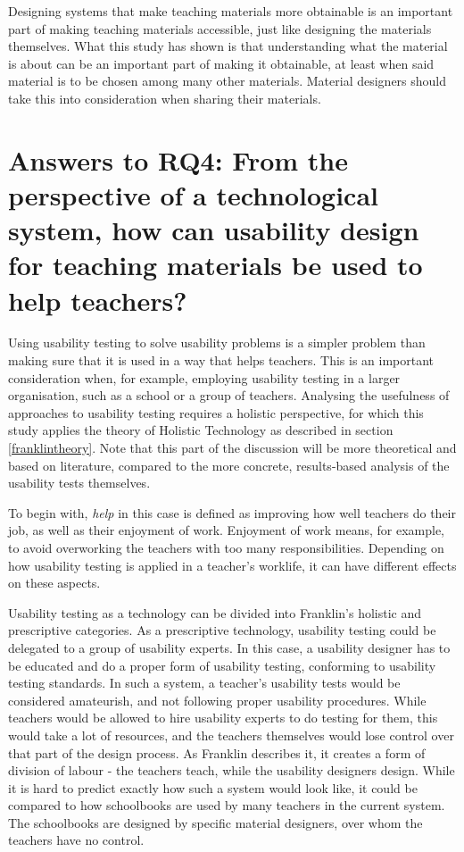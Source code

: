 Designing systems that make teaching materials more obtainable is an important part of making teaching materials accessible, just like designing the materials themselves. What this study has shown is that understanding what the material is about can be an important part of making it obtainable, at least when said material is to be chosen among many other materials. Material designers should take this into consideration when sharing their materials.

\section{Answers to RQ4: From the perspective of a technological system, how can usability design for teaching materials be used to help teachers?}

Using usability testing to solve usability problems is a simpler problem than making sure that it is used in a way that helps teachers. This is an important consideration when, for example, employing usability testing in a larger organisation, such as a school or a group of teachers. Analysing the usefulness of approaches to usability testing requires a holistic perspective, for which this study applies the theory of Holistic Technology as described in section \ref{franklintheory}. Note that this part of the discussion will be more theoretical and based on literature, compared to the more concrete, results-based analysis of the usability tests themselves.

To begin with, \textit{help} in this case is defined as improving how well teachers do their job, as well as their enjoyment of work. Enjoyment of work means, for example, to avoid overworking the teachers with too many responsibilities. Depending on how usability testing is applied in a teacher's worklife, it can have different effects on these aspects.

Usability testing as a technology can be divided into Franklin's holistic and prescriptive categories. As a prescriptive technology, usability testing could be delegated to a group of usability experts. In this case, a usability designer has to be educated and do a proper form of usability testing, conforming to usability testing standards. In such a system, a teacher's usability tests would be considered amateurish, and not following proper usability procedures. While teachers would be allowed to hire usability experts to do testing for them, this would take a lot of resources, and the teachers themselves would lose control over that part of the design process. As Franklin describes it, it creates a form of division of labour - the teachers teach, while the usability designers design. While it is hard to predict exactly how such a system would look like, it could be compared to how schoolbooks are used by many teachers in the current system. The schoolbooks are designed by specific material designers, over whom the teachers have no control.

